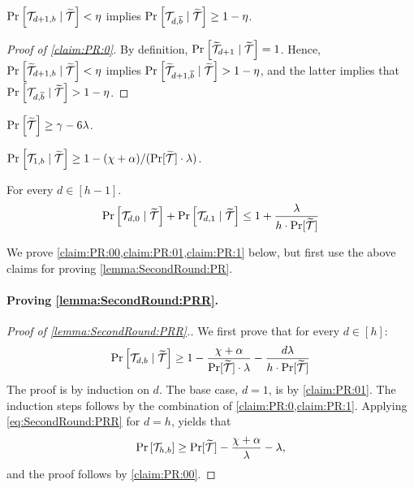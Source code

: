 \begin{claim}\label{claim:PR:0}
$\Pr_{}\left[\mathcal{T}_{d+1,b} \mid {\widetilde{\mathcal{T}}}\right] < \eta$ implies $\Pr_{}\left[\mathcal{T}_{d,\overline{b}} \mid {\widetilde{\mathcal{T}}}\right] \ge 1- \eta$.
\end{claim}
\begin{proof}[Proof of \cref{claim:PR:0}]
By definition, $\Pr_{}\left[{\widetilde{\mathcal{T}}}_{d+1} \mid {\widetilde{\mathcal{T}}}\right] =1$.	 Hence, $\Pr_{}\left[{\widetilde{\mathcal{T}}}_{d+1,b} \mid {\widetilde{\mathcal{T}}}\right]< \eta$ implies $\Pr_{}\left[{\widetilde{\mathcal{T}}}_{d+1,\overline{b}} \mid {\widetilde{\mathcal{T}}}\right]> 1 -\eta$, and the latter implies that $\Pr_{}\left[\mathcal{T}_{d,\overline{b}} \mid {\widetilde{\mathcal{T}}}\right]>  1 -\eta$.
\end{proof}


\begin{claim}\label{claim:PR:00}
$\Pr_{}\left[{\widetilde{\mathcal{T}}}\right] \ge \gamma- 6\lambda$.
\end{claim}

\begin{claim}\label{claim:PR:01}
$\Pr_{}\left[\mathcal{T}_{1,b} \mid {\widetilde{\mathcal{T}}}\right] \ge 1- (\chi + \alpha)/(\Pr[{\widetilde{\mathcal{T}}}]\cdot \lambda)$.
\end{claim}

\begin{claim}\label{claim:PR:1}
For every $d \in [h-1]$.
\[
\Pr_{}\left[\mathcal{T}_{d,0} \mid {\widetilde{\mathcal{T}}}\right] + \Pr_{}\left[\mathcal{T}_{d,1} \mid {\widetilde{\mathcal{T}}}\right] \le 1 + \frac{\lambda}{h\cdot\Pr[{\widetilde{\mathcal{T}}}]}
\]
\end{claim}

We prove \cref{claim:PR:00,claim:PR:01,claim:PR:1} below, but first use the above claims for proving \cref{lemma:SecondRound:PR}.

\paragraph{Proving \cref{lemma:SecondRound:PRR}.}


\begin{proof}[Proof of \cref{lemma:SecondRound:PRR}.]
We first prove that for every $d\in [h]$:
\begin{align}\label{eq:SecondRound:PRR}
\Pr_{}\left[\mathcal{T}_{d,b} \mid {\widetilde{\mathcal{T}}}\right] \ge 1- \frac{ \chi + \alpha}{\Pr[{\widetilde{\mathcal{T}}}]\cdot \lambda} - \frac{d\lambda}{h\cdot\Pr[{\widetilde{\mathcal{T}}}]}
\end{align}	
The proof is by induction on $d$. The base case, $d=1$, is by \cref{claim:PR:01}. The induction steps follows by the combination of \cref{claim:PR:0,claim:PR:1}. Applying \cref{eq:SecondRound:PRR} for $d=h$, yields that
\begin{align*}
\Pr_{}\left[\mathcal{T}_{h,b} \right] \ge \Pr[{\widetilde{\mathcal{T}}}]- \frac{ \chi +\alpha}{\lambda} - \lambda,
\end{align*}	
and the proof follows by \cref{claim:PR:00}.
\end{proof}


